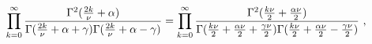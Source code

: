 \begin{equation}
\prod\limits_{k=0}^{\infty }\frac{\Gamma ^{2}(\frac{2k}{\nu }+\alpha )}{%
\Gamma (\frac{2k}{\nu }+\alpha +\gamma )\Gamma (\frac{2k}{\nu }+\alpha
-\gamma )}=\prod\limits_{k=0}^{\infty }\frac{\Gamma ^{2}(\frac{k\nu }{2}+%
\frac{\alpha \nu }{2})}{\Gamma (\frac{k\nu }{2}+\frac{\alpha \nu }{2}+\frac{%
\gamma \nu }{2})\Gamma (\frac{k\nu }{2}+\frac{\alpha \nu }{2}-\frac{\gamma
\nu }{2})}~,
\end{equation}%
